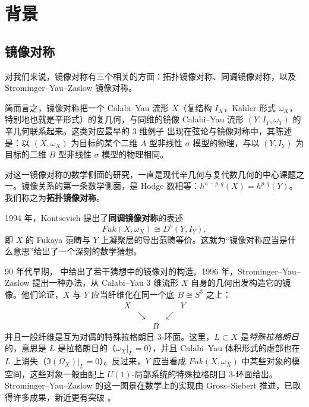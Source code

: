 
\section{背景}

\subsection{镜像对称}

对我们来说，镜像对称有三个相关的方面：拓扑镜像对称、同调镜像对称，以及 Strominger--Yau--Zaslow 镜像对称。

简而言之，镜像对称把一个 Calabi--Yau 流形 $X$（复结构 $I_X$，Kähler 形式 $\omega_X$，特别地也就是辛形式）的复几何，与同维的镜像 Calabi--Yau 流形 $(Y,I_Y,\omega_Y)$ 的辛几何联系起来。这类对应最早的 $3$ 维例子 \cite{greene-plesser} 出现在弦论与镜像对称中，其陈述是：以 $(X,\omega_X)$ 为目标的某个二维 $A$ 型非线性 $\sigma$ 模型的物理，与以 $(Y,I_Y)$ 为目标的二维 $B$ 型非线性 $\sigma$ 模型的物理相同。

对这一镜像对称的数学侧面的研究，一直是现代辛几何与复代数几何的中心课题之一。镜像关系的第一条数学侧面，是 Hodge 数相等：$h^{n-p,q}(X)=h^{p,q}(Y)$。我们称之为\textbf{拓扑镜像对称}。

1994 年，Kontsevich \cite{kontsevich} 提出了\textbf{同调镜像对称}的表述
\[
Fuk(X,\omega_X)\cong D^b(Y,I_Y),
\]
即 $X$ 的 Fukaya 范畴与 $Y$ 上凝聚层的导出范畴等价。这就为“镜像对称应当是什么意思”给出了一个深刻的数学猜想。

90 年代早期，\cite{candelas-etal1,batyrev1,batyrev-borisov} 中给出了若干猜想中的镜像对的构造。1996 年，Strominger--Yau--Zaslow \cite{strominger-etal} 提出一种办法，从 Calabi--Yau $3$ 维流形 $X$ 自身的几何出发构造它的镜像。他们论证，$X$ 与 $Y$ 应当纤维化在同一个底 $B\cong S^3$ 之上：
\begin{equation}\label{syz}
\begin{array}{ccccc}
X & & & & Y\\
 & \searrow & & \swarrow & \\
 & & B & &
\end{array}
\end{equation}
并且一般纤维是互为对偶的特殊拉格朗日 $3$-环面。这里，$L\subset X$ 是\emph{特殊拉格朗日}的，意思是 $L$ 是拉格朗日的（$\omega_X|_L=0$），并且 Calabi--Yau 体积形式的虚部也在 $L$ 上消失（$\Im(\Omega_X)|_L=0$）。反过来，$Y$ 应当看成 $Fuk(X,\omega_X)$ 中某些对象的模空间，这些对象一般由配上 $U(1)$-局部系统的特殊拉格朗日 $3$-环面给出。Strominger--Yau--Zaslow 的这一图景在数学上的实现由 Gross--Siebert \cite{gross-siebert1} 推进，已取得许多成果，新近更有突破 \cite{gross-siebert2,gross-etal}。

